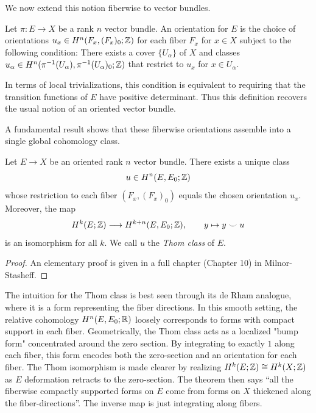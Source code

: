 \documentclass[12pt]{article}
\begin{document}
We now extend this notion fiberwise to vector bundles.
\begin{definition}
    Let $\pi: E \to X$ be a rank $n$ vector bundle. An orientation for $E$ is the choice of orientations $u_x \in H^n(F_x, (F_x)_0; \mathbb Z)$ for each fiber $F_x$ for $x \in X$ subject to the following condition: There exists a cover $\{U_\alpha\}$ of $X$ and classes $u_\alpha \in H^n(\pi^{-1}(U_\alpha), \pi^{-1}(U_\alpha)_0;\mathbb Z)$ that restrict to $u_x$ for $x \in U_\alpha$.  
\end{definition}
\begin{remark}
    In terms of local trivializations, this condition is equivalent to requiring that the transition functions of $E$ have positive determinant. Thus this definition recovers the usual notion of an oriented vector bundle.
\end{remark}

A fundamental result shows that these fiberwise orientations assemble into a single global cohomology class.
\begin{theorem}
Let $E\to X$ be an oriented rank $n$ vector bundle. There exists a unique class
\[ u \in H^n(E,E_0;\mathbb Z) \]
whose restriction to each fiber $(F_x,(F_x)_0)$ equals the chosen orientation $u_x$. Moreover, the map
\[ H^k(E;\mathbb Z) \longrightarrow H^{k+n}(E,E_0;\mathbb Z), \qquad y \mapsto y \smile u \]
is an isomorphism for all $k$. We call $u$ the \emph{Thom class} of $E$. 
\end{theorem}
\begin{proof}
    An elementary proof is given in a full chapter (Chapter 10) in Milnor-Stasheff. 
\end{proof}
\begin{remark}
    The intuition for the Thom class is best seen through its de Rham analogue, where it is a form representing the fiber directions. In this smooth setting, the relative cohomology $H^n(E,E_0;\mathbb R)$ loosely corresponds to forms with compact support in each fiber. Geometrically, the Thom class acts as a localized "bump form" concentrated around the zero section. By integrating to exactly $1$ along each fiber, this form encodes both the zero-section and an orientation for each fiber.
    The Thom isomorphism is made clearer by realizing $H^k(E; \mathbb Z) \cong H^k(X; \mathbb Z)$ as $E$ deformation retracts to the zero-section. The theorem then says ``all the fiberwise compactly supported forms on $E$ come from forms on $X$ thickened along the fiber-directions''. The inverse map is just integrating along fibers.
\end{remark}
\end{document}
